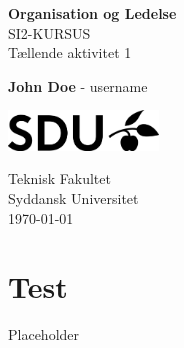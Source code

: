 \documentclass{article}
\begin{document}
\begin{titlepage}
    \begin{center}
        \vspace*{1cm}
        
        {\huge \textbf{Organisation og Ledelse}}
        \\SI2-KURSUS
        \\\vspace{0.5cm}
        Tællende aktivitet 1
        
        \vspace{1.5cm}
        
        \textbf{John Doe} - username \\
        
        
        \vspace{8.8cm}
        
        \hspace*{1.9cm}
        \includegraphics[width=0.3\textwidth]{assets/SDU_BLACK_RGB.png}
        
        Teknisk Fakultet \\
        Syddansk Universitet\\
        \today
    \end{center}
\end{titlepage}
\tableofcontents
\newpage

\section{Test}
Placeholder \cite{jones:2013}

\newpage
\printbibliography[title = {Kilder}]
\end{document}

